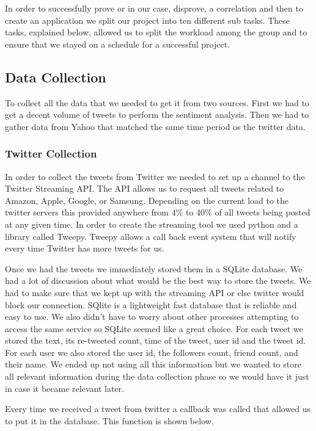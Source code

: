 \documentclass{acm_proc_article-sp}
\begin{document}
In order to successfully prove or in our case, disprove, a correlation and then
to create an application we split our project into ten different sub tasks.
These tasks, explained below, allowed us to split the workload among the group
and to ensure that we stayed on a schedule for a successful project.

\subsection{Data Collection} 

To collect all the data that we needed to get it from two sources.
First we had to get a decent volume of tweets to perform the sentiment
analysis. Then we had to gather data from Yahoo that matched the same time
period os the twitter data.

\subsubsection{Twitter Collection} 

In order to collect the tweets from Twitter we needed to set up a channel to
the Twitter Streaming API. The API allows us to request all tweets related to
Amazon, Apple, Google, or Samsung. Depending on the current load to the twitter
servers this provided anywhere from 4\% to 40\% of all tweets being posted at
any given time. In order to create the streaming tool we used python and a library
called Tweepy. Tweepy allows a call back event system that will notify every time
Twitter has more tweets for us. 

Once we had the tweets we immediately stored them in a SQLite database.  We had
a lot of discussion about what would be the best way to store the tweets. We
had to make sure that we kept up with the streaming API or else twitter would
block our connection. SQlite is a lightweight fast database that is reliable
and easy to use. We also didn't have to worry about other processes attempting
to access the same service so SQLite seemed like a great choice. For each tweet
we stored the text, its re-tweeted count, time of the tweet, user id and the
tweet id. For each user we also stored the user id, the followers count, friend
count, and their name. We ended up not using all this information but we wanted
to store all relevant information during the data collection phase so we would
have it just in case it became relevant later. 

Every time we received a tweet from twitter a callback was called that allowed
us to put it in the database. This function is shown below.
\end{document}
